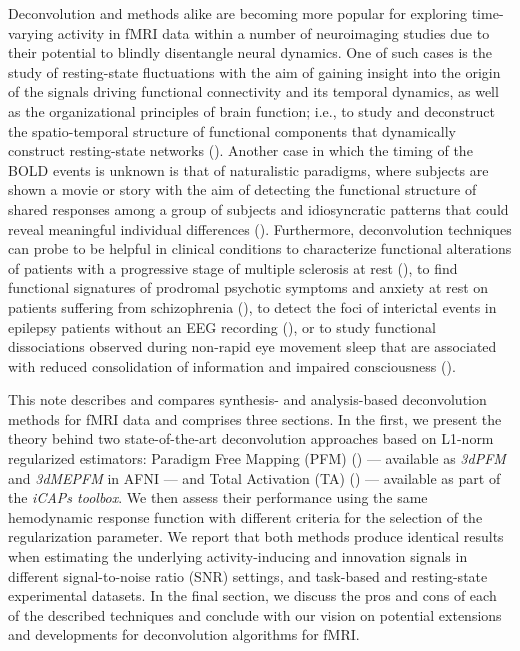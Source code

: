 Deconvolution and methods alike are becoming more popular for exploring time-varying activity in fMRI data within a number of neuroimaging studies due to their potential to blindly disentangle neural dynamics. One of such cases is the study of resting-state fluctuations with the aim of gaining insight into the origin of the signals driving functional connectivity and its temporal dynamics, as well as the organizational principles of brain function; i.e., to study and deconstruct the spatio-temporal structure of functional components that dynamically construct resting-state networks (\citealt{petridou2013PeriodsRestFMRI,karahanoglu2015TransientBrainActivity,karahanoglu2017DynamicsLargescaleFMRI,kinany2020DynamicFunctionalConnectivity,gonzalez-castillo2019ImagingSpontaneousFlow,allan2015FunctionalConnectivityMRI, zamaniesfahlani2020HighamplitudeCofluctuationsCortical}). Another case in which the timing of the BOLD events is unknown is that of naturalistic paradigms, where subjects are shown a movie or story with the aim of detecting the functional structure of shared responses among a group of subjects and idiosyncratic patterns that could reveal meaningful individual differences (\citealt{finn2020MoviewatchingOutperformsRest,finn2020IdiosynchronySharedResponses,betzel2020TemporalFluctuationsBrain,faskowitz2020EdgecentricFunctionalNetwork}). Furthermore, deconvolution techniques can probe to be helpful in clinical conditions to characterize functional alterations of patients with a progressive stage of multiple sclerosis at rest (\citealt{bommarito2020FunctionalNetworkDynamicsa}), to find functional signatures of prodromal psychotic symptoms and anxiety at rest on patients suffering from schizophrenia (\citealt{zoller2019LargeScaleBrainNetwork}), to detect the foci of interictal events in epilepsy patients without an EEG recording (\citealt{lopes2012DetectionEpilepticActivity}), or to study functional dissociations observed during non-rapid eye movement sleep that are associated with reduced consolidation of information and impaired consciousness (\citealt{tarun2021NREMSleepStagesa}).

This note describes and compares synthesis- and analysis-based deconvolution methods for fMRI data and comprises three sections. In the first, we present the theory behind two state-of-the-art deconvolution approaches based on L1-norm regularized estimators: Paradigm Free Mapping (PFM) (\citealt{caballerogaudes2013ParadigmFreeMapping}) --- available as \textit{3dPFM} and \textit{3dMEPFM} in AFNI --- and Total Activation (TA) (\citealt{karahanoglu2013TotalActivationFMRI}) --- available as part of the \textit{iCAPs toolbox}. We then assess their performance using the same hemodynamic response function with different criteria for the selection of the regularization parameter. We report that both methods produce identical results when estimating the underlying activity-inducing and innovation signals in different signal-to-noise ratio (SNR) settings, and task-based and resting-state experimental datasets. In the final section, we discuss the pros and cons of each of the described techniques and conclude with our vision on potential extensions and developments for deconvolution algorithms for fMRI.